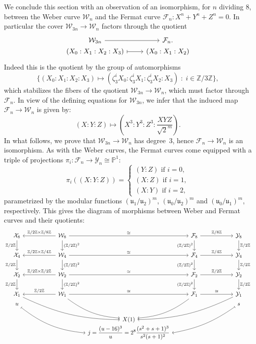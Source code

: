 \documentclass{amsart}
\newcommand{\cF}{\mathcal{F}}
\newcommand{\cX}{\mathcal{X}}
\newcommand{\cY}{\mathcal{Y}}
\newcommand{\cW}{\mathcal{W}}
\newcommand{\PP}{\mathbb{P}}
\newcommand{\ZZ}{\mathbb{Z}}
\newcommand{\isom}{\cong}
\newcommand{\uu}{\mathfrak{u}}
\begin{document}
We conclude this section with an observation of an isomorphism, for $n$ dividing $8$,
between the Weber curve $\cW_n$ and the Fermat curve $\cF_n : X^n + Y^n + Z^n = 0$.
In particular the cover $\cW_{3n} \to \cW_n$ factors through the quotient
$$
\begin{tikzcd}[row sep=0pt]
  \cW_{3n} \arrow[r] & \cF_n. \\
  (X_0:X_1:X_2:X_3) \arrow[|->,r] & (X_0:X_1:X_2)
\end{tikzcd}
$$
Indeed this is the quotient by the group of automorphisms
$$
\{ (X_0:X_1:X_2:X_3) \mapsto (\zeta_3^iX_0:\zeta_3^iX_1:\zeta_3^iX_2:X_3) \;:\; i \in \ZZ/3\ZZ \},
$$
which stabilizes the fibers of the quotient $\cW_{3n} \to \cW_n$, which must factor
through $\cF_n$. In view of the defining equations for $\cW_{3n}$, we infer that
the induced map $\cF_n \to \cW_n$ is given by:
$$
(X:Y:Z) \longmapsto \left(X^3:Y^3:Z^3:\frac{XYZ}{\sqrt{2}^m}\right).
$$
In what follows, we prove that $\cW_{3n} \to \cW_n$ has degree~$3$, hence $\cF_n \to \cW_n$
is an isomorphism.
As with the Weber curves, the Fermat curves come equipped with a triple of projections
$\pi_i: \cF_n \to \cY_n \isom \PP^1$:
$$
\pi_i((X:Y:Z)) = \left\{
\begin{array}{l}
  (Y:Z) \mbox{ if } i = 0,\\
  (X:Z) \mbox{ if } i = 1,\\
  (X:Y) \mbox{ if } i = 2,
\end{array}\right.
$$
parametrized by the modular functions $(\uu_1/\uu_2)^m$, $(\uu_0/\uu_2)^m$ and $(\uu_0/\uu_1)^m$,
respectively. This gives the diagram of morphisms between Weber and Fermat curves and their quotients:
$$
\begin{tikzcd}[column sep=10mm]
  \cX_8 \arrow[d,"\ZZ/2\ZZ",swap]   && \arrow[ll,swap,"\ZZ/2\ZZ\times\ZZ/8\ZZ"] \cW_8 \arrow[d,"(\ZZ/2\ZZ)^2"] \arrow[rr,"\isom"] && \cF_8 \arrow[d,"(\ZZ/2\ZZ)^2",swap] \arrow[rr,"\ZZ/8\ZZ"] && \cY_8 \arrow[d,"\ZZ/2\ZZ"] \\
  \cX_4 \arrow[d,"\ZZ/2\ZZ",swap]   && \arrow[ll,swap,"\ZZ/2\ZZ\times\ZZ/4\ZZ"] \cW_4 \arrow[d,"(\ZZ/2\ZZ)^2"] \arrow[rr,"\isom"] && \cF_4 \arrow[d,"(\ZZ/2\ZZ)^2",swap] \arrow[rr,"\ZZ/4\ZZ"] && \cY_4 \arrow[d,"\ZZ/2\ZZ"] \\
  \cX_2 \arrow[d,"\ZZ/2\ZZ",swap]   && \arrow[ll,swap,"\ZZ/2\ZZ\times\ZZ/2\ZZ"] \cW_2 \arrow[d,"(\ZZ/2\ZZ)^2"] \arrow[rr,"\isom"] && \cF_2 \arrow[d,"(\ZZ/2\ZZ)^2",swap] \arrow[rr,"\ZZ/2\ZZ"] && \cY_2 \arrow[d,"\ZZ/2\ZZ"] \\
  \cX_1 \arrow[ddrrr,bend right=12,end anchor=west] &&
  \cW_1 \arrow[ll,swap,"\ZZ/2\ZZ"] \arrow[ddr,bend right=16,end anchor={[yshift=1.0mm]west}] \arrow[rr,"\isom"] &&
  \cF_1 \arrow[ddl,bend left=16,end anchor={[yshift=1.0mm]east}] \arrow[rr,"\isom"] &&
  \cY_1 \arrow[ddlll,bend left=12] \\[-5mm]
  u \arrow[ddrrr,mapsto,bend right=16,end anchor=west] && && && s \arrow[ddlll,mapsto,bend left=12,end anchor=east]\\[-2mm]
  &&& X(1) \\[-7mm]
  &&& \displaystyle j = \frac{(u-16)^3}{u} = 2^8\frac{(s^2+s+1)^3}{s^2(s+1)^2}
\end{tikzcd}
$$
\end{document}

